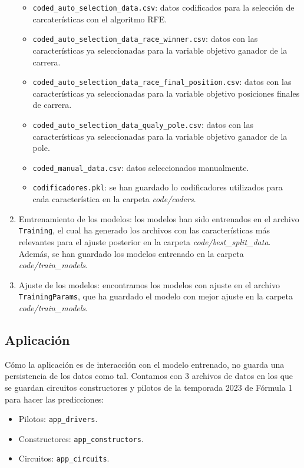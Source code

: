 \begin{enumerate}
        \begin{itemize}
            \item \texttt{coded\_auto\_selection\_data.csv}: datos codificados para la selección de carcaterísticas con el algoritmo RFE.
            \item \texttt{coded\_auto\_selection\_data\_race\_winner.csv}: datos con las características ya seleccionadas para la variable objetivo ganador de la carrera.
            \item \texttt{coded\_auto\_selection\_data\_race\_final\_position.csv}: datos con las características ya seleccionadas para la variable objetivo posiciones finales de carrera.
            \item \texttt{coded\_auto\_selection\_data\_qualy\_pole.csv}: datos con las características ya seleccionadas para la variable objetivo ganador de la pole.
            \item \texttt{coded\_manual\_data.csv}: datos seleccionados manualmente.
            \item \texttt{codificadores.pkl}: se han guardado lo codificadores utilizados para cada característica en la carpeta \textit{code/coders}.
        \end{itemize}
    \item Emtrenamiento de los modelos: los modelos han sido entrenados en el archivo \texttt{Training}, el cual ha generado los archivos con las características más relevantes para el ajuste posterior en la carpeta \textit{code/best\_split\_data}. Además, se han guardado los modelos entrenado en la carpeta \textit{code/train\_models}.
    \item Ajuste de los modelos: encontramos los modelos con ajuste en el archivo \texttt{TrainingParams}, que ha guardado el modelo con mejor ajuste en la carpeta \textit{code/train\_models}.
\end{enumerate}

\subsection{Aplicación}

Cómo la aplicación es de interacción con el modelo entrenado, no guarda una persistencia de los datos como tal. Contamos con 3 archivos de datos en los que se guardan circuitos constructores y pilotos de la temporada 2023 de Fórmula 1 para hacer las predicciones:
\begin{itemize}
    \item Pilotos: \texttt{app\_drivers}.
    \item Constructores: \texttt{app\_constructors}.
    \item Circuitos: \texttt{app\_circuits}.
\end{itemize}


